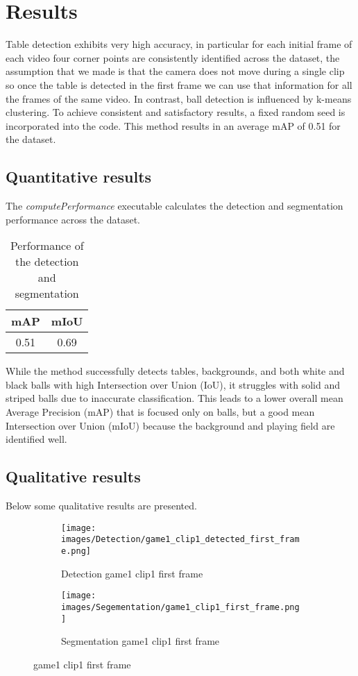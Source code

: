 \section{Results}

Table detection exhibits very high accuracy, in particular for each initial frame of each video four corner points are consistently identified across the dataset, the assumption that we made is that the camera does not move during a single clip so once the table is detected in the first frame we can use that information for all the frames of the same video.
In contrast, ball detection is influenced by k-means clustering. To achieve consistent and satisfactory results, a fixed random seed is incorporated into the code. This method results in an average mAP of 0.51 for the dataset.

\subsection{Quantitative results}
The \textit{computePerformance} executable calculates the detection and segmentation performance across the dataset.
\begin{table}
	\centering
    \begin{tabular}{|c|c|}
        \hline
        mAP & mIoU \\
        \hline
        0.51 & 0.69 \\
        \hline
    \end{tabular}
    \caption{Performance of the detection and segmentation}
    \label{tab: performance}
\end{table}
While the method successfully detects tables, backgrounds, and both white and black balls with high Intersection
over Union (IoU), it struggles with solid and striped balls due to inaccurate classification.
This leads to a lower overall mean Average Precision (mAP) that is focused only on balls,
but a good mean Intersection over Union (mIoU) because the background and playing field are identified well.

\subsection{Qualitative results}
Below some qualitative results are presented.
\begin{figure}
    \centering
    \begin{subfigure}[b]{0.45\textwidth}
        \centering
        \texttt{[image: images/Detection/game1\_clip1\_detected\_first\_frame.png]}
        \caption{Detection game1 clip1 first frame}
        \label{fig: game1_clip1_first_frame_detected}
    \end{subfigure}
    \begin{subfigure}[b]{0.45\textwidth}
        \centering
        \texttt{[image: images/Segementation/game1\_clip1\_first\_frame.png]}
        \caption{Segmentation game1 clip1 first frame}
		\label{fig: game1_clip1_first_frame_segmented}
    \end{subfigure}
	\caption{game1 clip1 first frame}
\end{figure}


